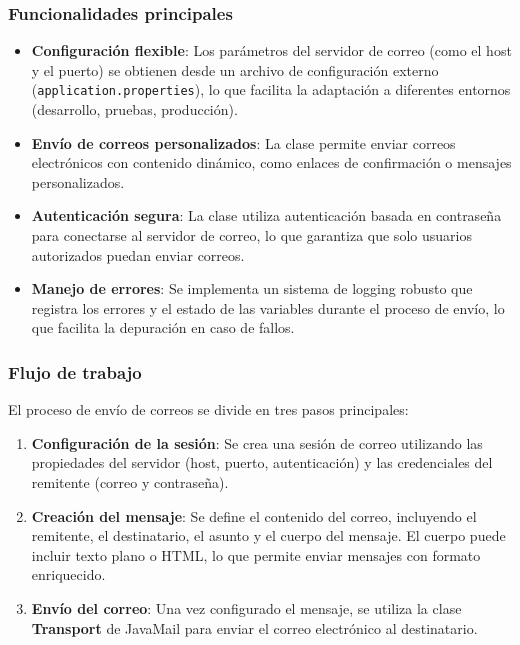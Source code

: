 \documentclass[draft]{scrbook}
\begin{document}
\subsubsection{Funcionalidades principales}

\begin{itemize}
    \item \textbf{Configuración flexible}: Los parámetros del servidor de correo (como el host y el puerto) se obtienen desde un archivo de configuración externo (\texttt{application.properties}), lo que facilita la adaptación a diferentes entornos (desarrollo, pruebas, producción).
    
    \item \textbf{Envío de correos personalizados}: La clase permite enviar correos electrónicos con contenido dinámico, como enlaces de confirmación o mensajes personalizados.
    
    \item \textbf{Autenticación segura}: La clase utiliza autenticación basada en contraseña para conectarse al servidor de correo, lo que garantiza que solo usuarios autorizados puedan enviar correos.
    
    \item \textbf{Manejo de errores}: Se implementa un sistema de logging robusto que registra los errores y el estado de las variables durante el proceso de envío, lo que facilita la depuración en caso de fallos.
\end{itemize}

\subsubsection{Flujo de trabajo}

El proceso de envío de correos se divide en tres pasos principales:

\begin{enumerate}
    \item \textbf{Configuración de la sesión}: Se crea una sesión de correo utilizando las propiedades del servidor (host, puerto, autenticación) y las credenciales del remitente (correo y contraseña).
    
    \item \textbf{Creación del mensaje}: Se define el contenido del correo, incluyendo el remitente, el destinatario, el asunto y el cuerpo del mensaje. El cuerpo puede incluir texto plano o HTML, lo que permite enviar mensajes con formato enriquecido.
    
    \item \textbf{Envío del correo}: Una vez configurado el mensaje, se utiliza la clase \textbf{Transport} de JavaMail para enviar el correo electrónico al destinatario.
\end{enumerate}
\end{document}
